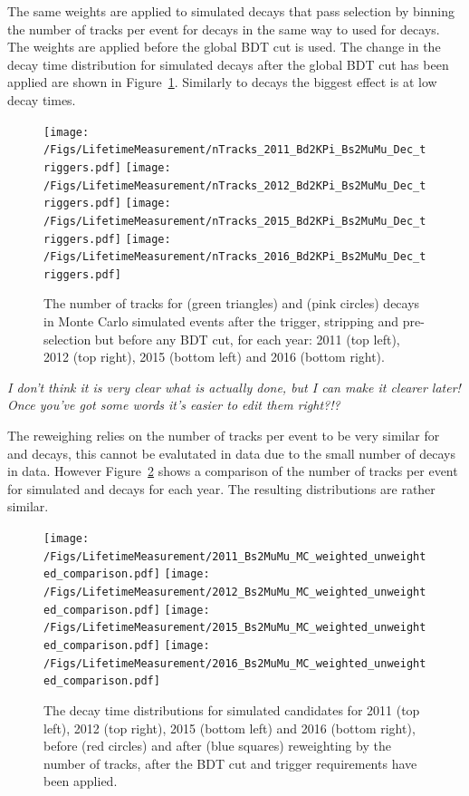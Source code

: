 The same weights are applied to simulated \bsmumu decays that pass selection by binning the number of tracks per event for \bsmumu decays in the same way to used for \bdkpi decays. The weights are applied before the global BDT cut is used. The change in the decay time distribution for \bsmuu simulated decays after the global BDT cut has been applied are shown in Figure~\ref{fig:BsmmVsBdToKpinTracks}. Similarly to \bdkpi decays the biggest effect is at low decay times.



\begin{figure}[ht]
  \centering
    \texttt{[image: /Figs/LifetimeMeasurement/nTracks\_2011\_Bd2KPi\_Bs2MuMu\_Dec\_triggers.pdf]}
    \texttt{[image: /Figs/LifetimeMeasurement/nTracks\_2012\_Bd2KPi\_Bs2MuMu\_Dec\_triggers.pdf]}
    \texttt{[image: /Figs/LifetimeMeasurement/nTracks\_2015\_Bd2KPi\_Bs2MuMu\_Dec\_triggers.pdf]}
    \texttt{[image: /Figs/LifetimeMeasurement/nTracks\_2016\_Bd2KPi\_Bs2MuMu\_Dec\_triggers.pdf]}
  \caption{The number of tracks for \bdkpi (green triangles) and \bsmumu (pink circles) decays in Monte Carlo simulated events after the trigger, stripping and pre-selection but before any BDT cut, for each year: 2011 (top left), 2012 (top right), 2015 (bottom left) and 2016 (bottom right). }
  \label{fig:BsmmVsBdToKpinTracks}
\end{figure}


{\it I don't think it is very clear what is actually done, but I can make it clearer later! Once you've got some words it's easier to edit them right?!?}

The reweighing relies on the number of tracks per event to be very similar for \bdkpi and \bsmumu decays, this cannot be evalutated in data due to the small number of \bsmumu decays in data. However Figure~\ref{fig:BsTomumu_weightDecayTime} shows a comparison of the number of tracks per event for simulated \bsmumu and \bdkpi decays for each year. The resulting distributions are rather similar.
\begin{figure}[ht]
  \centering
    \texttt{[image: /Figs/LifetimeMeasurement/2011\_Bs2MuMu\_MC\_weighted\_unweighted\_comparison.pdf]}
    \texttt{[image: /Figs/LifetimeMeasurement/2012\_Bs2MuMu\_MC\_weighted\_unweighted\_comparison.pdf]}
    \texttt{[image: /Figs/LifetimeMeasurement/2015\_Bs2MuMu\_MC\_weighted\_unweighted\_comparison.pdf]}
    \texttt{[image: /Figs/LifetimeMeasurement/2016\_Bs2MuMu\_MC\_weighted\_unweighted\_comparison.pdf]}
  \caption{The decay time distributions for \bsmumu simulated candidates for 2011 (top left), 2012 (top right), 2015 (bottom left) and 2016 (bottom right), before (red circles) and after (blue squares) reweighting by the number of tracks, after the BDT cut and trigger requirements have been applied.}
  \label{fig:BsTomumu_weightDecayTime}
\end{figure}



